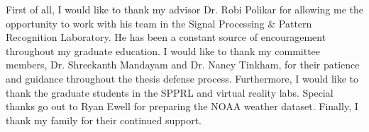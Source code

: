 \begin{acknowledge}
First of all, I would like to thank my advisor Dr. Robi Polikar for allowing me
the opportunity to work with his team in the Signal Processing \& Pattern 
Recognition Laboratory. He has been a constant source of encouragement throughout 
my graduate education. I would like to thank my committee members, Dr. Shreekanth 
Mandayam and Dr. Nancy Tinkham, for their patience and guidance throughout the 
thesis defense process. Furthermore, I would like to thank the graduate students 
in the SPPRL and virtual reality labs. Special thanks go out to Ryan Ewell for 
preparing the NOAA weather dataset. Finally, I thank my family for their 
continued support.
\end{acknowledge}
